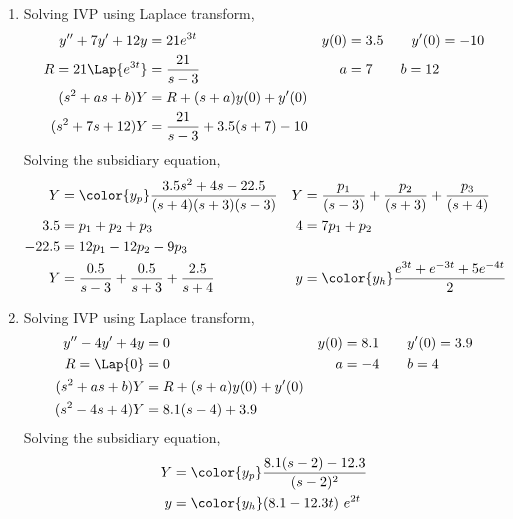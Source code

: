 \begin{enumerate}
    \item Solving IVP using Laplace transform,
          \begin{align}
              y'' + 7y' + 12y      & = 21e^{3t}                         &
              y(0)                 & = 3.5 \qquad y'(0) = -10             \\
              R = 21\Lap\{e^{3t}\} & = \frac{21}{s - 3}                 &
              a                    & = 7 \qquad b = 12                    \\
              (s^2 + as + b)Y      & = R + (s+a)y(0) + y'(0)              \\
              (s^2 + 7s + 12)Y     & = \frac{21}{s - 3} + 3.5(s+7) - 10
          \end{align}
          Solving the subsidiary equation,
          \begin{align}
              Y                 & = \color{y_p}\frac{3.5s^2 + 4s - 22.5}
              {(s+4)(s+3)(s-3)} &
              Y                 & = \frac{p_1}{(s-3)} + \frac{p_2}{(s+3)}
              + \frac{p_3}{(s+4)}                                           \\
              3.5               & = p_1 + p_2 + p_3                       &
              4                 & = 7p_1 + p_2                              \\
              -22.5             & = 12p_1 - 12p_2 - 9p_3                    \\
              Y                 & = \frac{0.5}{s-3} + \frac{0.5}{s+3}
              + \frac{2.5}{s+4} &
              y                 & = \color{y_h} \frac{e^{3t} + e^{-3t}
                  + 5e^{-4t}}{2}
          \end{align}

    \item Solving IVP using Laplace transform,
          \begin{align}
              y'' - 4y' + 4y  & = 0                      &
              y(0)            & = 8.1 \qquad y'(0) = 3.9   \\
              R = \Lap\{0\}   & = 0                      &
              a               & = -4 \qquad b = 4          \\
              (s^2 + as + b)Y & = R + (s+a)y(0) + y'(0)    \\
              (s^2 - 4s + 4)Y & = 8.1(s - 4) + 3.9
          \end{align}
          Solving the subsidiary equation,
          \begin{align}
              Y & = \color{y_p}\frac{8.1(s-2) - 12.3}{(s-2)^2} \\
              y & = \color{y_h} (8.1 - 12.3t)\ e^{2t}
          \end{align}


\end{enumerate}
